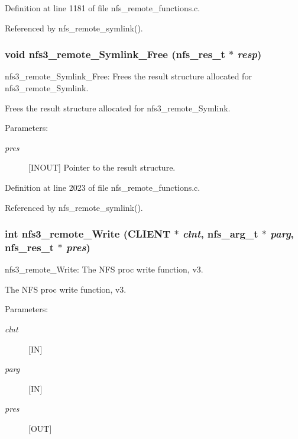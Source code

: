Definition at line 1181 of file nfs\_\-remote\_\-functions.c.

Referenced by nfs\_\-remote\_\-symlink().
\subsubsection{\setlength{\rightskip}{0pt plus 5cm}void nfs3\_\-remote\_\-Symlink\_\-Free (nfs\_\-res\_\-t $\ast$ {\em resp})}\label{group__NFSprocs_ga81}


nfs3\_\-remote\_\-Symlink\_\-Free: Frees the result structure allocated for nfs3\_\-remote\_\-Symlink.

Frees the result structure allocated for nfs3\_\-remote\_\-Symlink.

\begin{Desc}
\item[Parameters:]
\begin{description}
\item[{\em pres}][INOUT] Pointer to the result structure. \end{description}
\end{Desc}


Definition at line 2023 of file nfs\_\-remote\_\-functions.c.

Referenced by nfs\_\-remote\_\-symlink().
\subsubsection{\setlength{\rightskip}{0pt plus 5cm}int nfs3\_\-remote\_\-Write (CLIENT $\ast$ {\em clnt}, nfs\_\-arg\_\-t $\ast$ {\em parg}, nfs\_\-res\_\-t $\ast$ {\em pres})}\label{group__NFSprocs_ga24}


nfs3\_\-remote\_\-Write: The NFS proc write function, v3.

The NFS proc write function, v3.

\begin{Desc}
\item[Parameters:]
\begin{description}
\item[{\em clnt}][IN] \item[{\em parg}][IN] \item[{\em pres}][OUT] \end{description}
\end{Desc}


